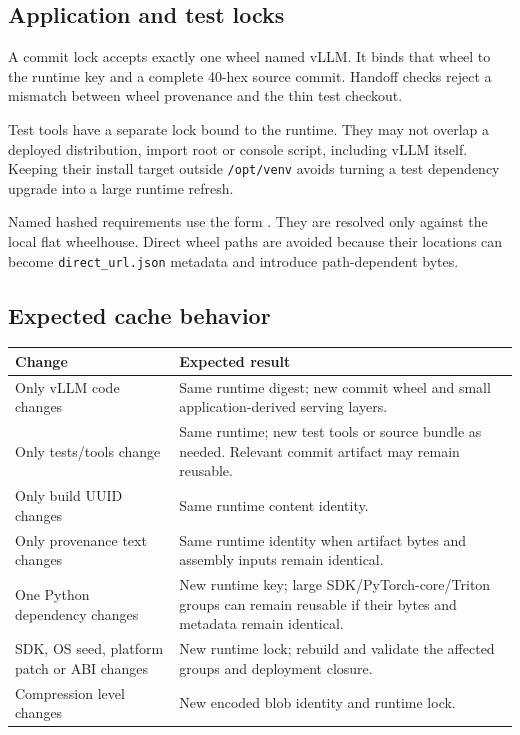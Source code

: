 \documentclass[11pt,a4paper]{article}
\newcommand{\file}[1]{\nolinkurl{#1}}
\newcommand{\term}[1]{\texttt{\detokenize{#1}}}
\begin{document}
\subsection{Application and test locks}

A commit lock accepts exactly one wheel named vLLM. It binds that wheel to the
runtime key and a complete 40-hex source commit. Handoff checks reject a mismatch
between wheel provenance and the thin test checkout.

Test tools have a separate lock bound to the runtime. They may not overlap a
deployed distribution, import root or console script, including vLLM itself.
Keeping their install target outside \file{/opt/venv} avoids turning a test
dependency upgrade into a large runtime refresh.

Named hashed requirements use the form
\term{package==version --hash=sha256:...}. They are resolved only against the
local flat wheelhouse. Direct wheel paths are avoided because their locations
can become \file{direct_url.json} metadata and introduce path-dependent bytes.

\subsection{Expected cache behavior}

\begin{tabularx}{\textwidth}{L{48mm}X}
\toprule
Change & Expected result \\
\midrule
Only vLLM code changes & Same runtime digest; new commit wheel and small
application-derived serving layers. \\
Only tests/tools change & Same runtime; new test tools or source bundle as
needed. Relevant commit artifact may remain reusable. \\
Only build UUID changes & Same runtime content identity. \\
Only provenance text changes & Same runtime identity when artifact bytes and
assembly inputs remain identical. \\
One Python dependency changes & New runtime key; large SDK/PyTorch-core/Triton
groups can remain reusable if their bytes and metadata remain identical. \\
SDK, OS seed, platform patch or ABI changes & New runtime lock; rebuild and
validate the affected groups and deployment closure. \\
Compression level changes & New encoded blob identity and runtime lock. \\
\bottomrule
\end{tabularx}
\end{document}
